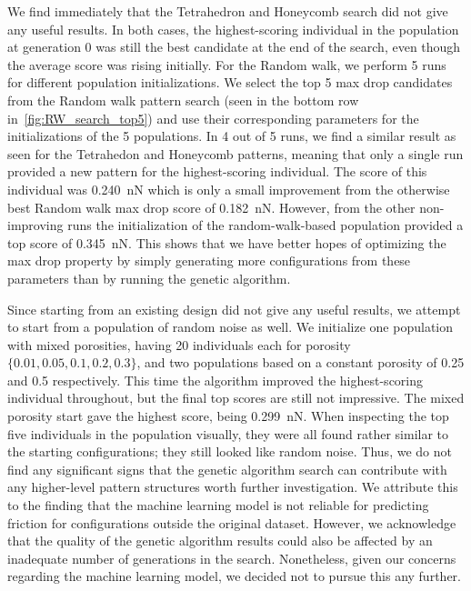 We find immediately that the Tetrahedron and Honeycomb search did not give any useful results. In both cases, the highest-scoring individual in the population at generation 0 was still the best candidate at the end of the search, even though the average score was rising initially. For the Random walk, we perform 5 runs for different population initializations. We select the top 5 max drop candidates from the Random walk pattern search (seen in the bottom row in~\cref{fig:RW_search_top5}) and use their corresponding parameters for the initializations of the 5 populations. In 4 out of 5 runs, we find a similar result as seen for the Tetrahedon and Honeycomb patterns, meaning that only a single run provided a new pattern for the highest-scoring individual. The score of this individual was \SI{0.240}{nN} which is only a small improvement from the otherwise best Random walk max drop score of
\SI{0.182}{nN}. However, from the other non-improving runs the initialization of the random-walk-based population provided a top score of \SI{0.345}{nN}. This shows that we have better hopes of optimizing the max drop property by simply generating more configurations from these parameters than by running the genetic algorithm. 

Since starting from an existing design did not give any useful results, we attempt to start from a population of random noise as well. We initialize one population with mixed porosities, having 20 individuals each for porosity $\{0.01, 0.05, 0.1, 0.2, 0.3\}$, and two populations based on a constant porosity of 0.25 and 0.5 respectively. This time the algorithm improved the highest-scoring individual throughout, but
the final top scores are still not impressive. The mixed porosity start gave the
highest score, being \SI{0.299}{nN}. When inspecting the top five individuals in the population visually, they were all found rather similar to the starting configurations; they still looked like random noise. Thus, we do not find any significant signs that the genetic algorithm search can contribute with any higher-level pattern structures worth further investigation. We attribute this to the finding that the machine learning model is not reliable for predicting friction for configurations outside the original dataset. However, we acknowledge that the quality of the genetic algorithm results could also be affected by an inadequate number of generations in the search. Nonetheless, given our concerns regarding the machine learning model, we decided not to pursue this any further.

